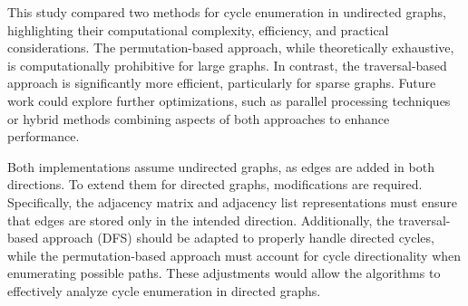 \documentclass{sbc2023}%
\begin{document}
This study compared two methods for cycle enumeration in undirected graphs, highlighting their computational complexity, efficiency, and practical considerations. The permutation-based approach, while theoretically exhaustive, is computationally prohibitive for large graphs. In contrast, the traversal-based approach is significantly more efficient, particularly for sparse graphs. Future work could explore further optimizations, such as parallel processing techniques or hybrid methods combining aspects of both approaches to enhance performance.

Both implementations assume undirected graphs, as edges are added in both directions. To extend them for directed graphs, modifications are required. Specifically, the adjacency matrix and adjacency list representations must ensure that edges are stored only in the intended direction. Additionally, the traversal-based approach (DFS) should be adapted to properly handle directed cycles, while the permutation-based approach must account for cycle directionality when enumerating possible paths. These adjustments would allow the algorithms to effectively analyze cycle enumeration in directed graphs.

\nocite{*} %
\printbibliography[title={References}] %
\end{document}
